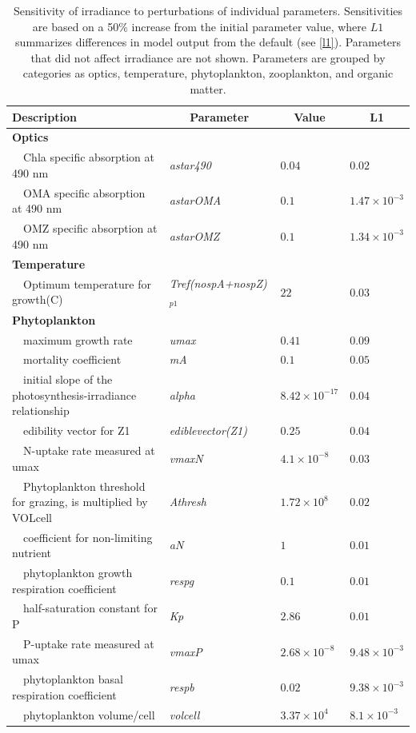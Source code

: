 \documentclass[review]{elsarticle}\usepackage[]{graphicx}\usepackage[]{color}
\begin{document}
\begin{table}[!tbp]
{\footnotesize
\caption{Sensitivity of irradiance to perturbations of individual parameters.  Sensitivities are based on a 50\% increase from the initial parameter value, where $L1$ summarizes differences in model output from the default (see \cref{l1}).  Parameters that did not affect irradiance are not shown.  Parameters are grouped by categories as optics, temperature, phytoplankton, zooplankton, and organic matter.\label{tab:irrsens}} 
\begin{center}
\begin{tabular}{llll}
\hline\hline
\multicolumn{1}{l}{Description}&\multicolumn{1}{c}{Parameter}&\multicolumn{1}{c}{Value}&\multicolumn{1}{c}{L1}\tabularnewline
\hline
{\bfseries Optics}&&&\tabularnewline
~~Chla specific absorption at 490 nm&\textit{astar490}&$0.04$&$0.02$\tabularnewline
~~OMA specific absorption at 490 nm&\textit{astarOMA}&$0.1$&$1.47\times 10^{-3}$\tabularnewline
~~OMZ specific absorption at 490 nm&\textit{astarOMZ}&$0.1$&$1.34\times 10^{-3}$\tabularnewline
\hline
{\bfseries Temperature}&&&\tabularnewline
~~Optimum temperature for growth(C)&\textit{Tref(nospA+nospZ)$_{p1}$}&$22$&$0.03$\tabularnewline
\hline
{\bfseries Phytoplankton}&&&\tabularnewline
~~maximum growth rate&\textit{umax}&$0.41$&$0.09$\tabularnewline
~~mortality coefficient&\textit{mA}&$0.1$&$0.05$\tabularnewline
~~initial slope of the photosynthesis-irradiance relationship&\textit{alpha}&$8.42\times 10^{-17}$&$0.04$\tabularnewline
~~edibility vector for Z1&\textit{ediblevector(Z1)}&$0.25$&$0.04$\tabularnewline
~~N-uptake rate measured at umax&\textit{vmaxN}&$4.1\times 10^{-8}$&$0.03$\tabularnewline
~~Phytoplankton threshold for grazing, is multiplied by VOLcell&\textit{Athresh}&$1.72\times 10^{8}$&$0.02$\tabularnewline
~~coefficient for non-limiting nutrient&\textit{aN}&$1$&$0.01$\tabularnewline
~~phytoplankton growth respiration coefficient&\textit{respg}&$0.1$&$0.01$\tabularnewline
~~half-saturation constant for P&\textit{Kp}&$2.86$&$0.01$\tabularnewline
~~P-uptake rate measured at umax&\textit{vmaxP}&$2.68\times 10^{-8}$&$9.48\times 10^{-3}$\tabularnewline
~~phytoplankton basal respiration coefficient&\textit{respb}&$0.02$&$9.38\times 10^{-3}$\tabularnewline
~~phytoplankton volume/cell&\textit{volcell}&$3.37\times 10^{4}$&$8.1\times 10^{-3}$\tabularnewline

\end{tabular}
\end{center}}
\end{table}
\end{document}
